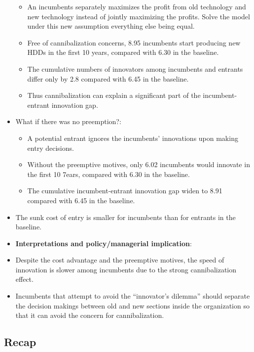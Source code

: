 \documentclass[]{book}
\providecommand{\tightlist}{%
  \setlength{\itemsep}{0pt}\setlength{\parskip}{0pt}}
\begin{document}
\begin{itemize}
  \begin{itemize}
  \tightlist
  \item
    An incumbents separately maximizes the profit from old technology
    and new technology instead of jointly maximizing the profits. Solve
    the model under this new assumption everything else being equal.
  \item
    Free of cannibalization concerns, 8.95 incumbents start producing
    new HDDs in the first 10 years, compared with 6.30 in the baseline.
  \item
    The cumulative numbers of innovators among incumbents and entrants
    differ only by 2.8 compared with 6.45 in the baseline.
  \item
    Thus cannibalization can explain a significant part of the
    incumbent-entrant innovation gap.
  \end{itemize}
\item
  What if there was no preemption?:

  \begin{itemize}
  \tightlist
  \item
    A potential entrant ignores the incumbents' innovations upon making
    entry decisions.
  \item
    Without the preemptive motives, only 6.02 incumbents would innovate
    in the first 10 7ears, compared with 6.30 in the baseline.
  \item
    The cumulative incumbent-entrant innovation gap widen to 8.91
    compared with 6.45 in the baseline.
  \end{itemize}
\item
  The sunk cost of entry is smaller for incumbents than for entrants in
  the baseline.
\item
  \textbf{Interpretations and policy/managerial implication}:
\item
  Despite the cost advantage and the preemptive motives, the speed of
  innovation is slower among incumbents due to the strong
  cannibalization effect.
\item
  Incumbents that attempt to avoid the ``innovator's dilemma'' should
  separate the decision makings between old and new sections inside the
  organization so that it can avoid the concern for cannibalization.
\end{itemize}

\subsection{Recap}\label{recap}
\end{document}
